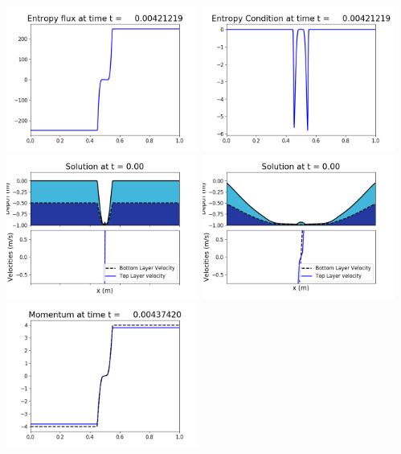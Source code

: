 \documentclass[11pt]{article}
\begin{document}
\includegraphics[width=0.475\textwidth]{frame0027fig1008.png}
\vskip 10pt 
\includegraphics[width=0.475\textwidth]{frame0027fig1009.png}
\vskip 10pt 
\includegraphics[width=0.475\textwidth]{frame0028fig1001.png}
\includegraphics[width=0.475\textwidth]{frame0028fig1002.png}
\vskip 10pt 
\includegraphics[width=0.475\textwidth]{frame0028fig1003.png}
\end{document}
